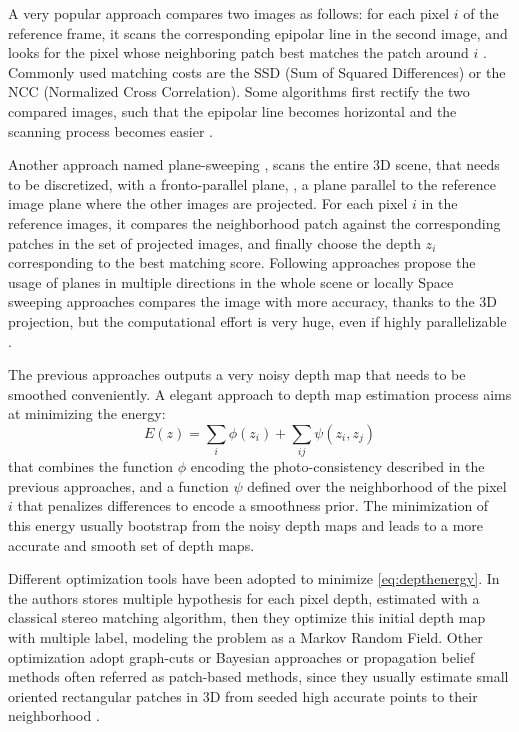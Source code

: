 A very popular approach compares two images as follows: for each pixel $i$ of the reference frame, it scans the corresponding epipolar line in the second image, and looks for the pixel whose neighboring patch best matches the patch around $i$  \cite{lhuillier2002match}. 
Commonly used matching costs are the SSD (Sum of Squared Differences) or the NCC (Normalized Cross Correlation).
Some algorithms first rectify the two compared images, such that the epipolar line becomes horizontal and the scanning process becomes easier 
\cite{kang2001handling,bradley2008accurate,moons20093d}. 

Another approach named plane-sweeping \cite{collins1996space}, scans the entire 3D scene, that needs to be discretized, with a fronto-parallel plane, \ie, a plane parallel to the reference image plane where the other images are projected. For each pixel $i$ in the reference images, it compares the neighborhood patch against the corresponding patches in the set of projected images, and finally choose the depth $z_i$ corresponding to the best matching score. 
Following approaches propose the usage of planes in multiple directions in the whole scene \cite{gallup2007real} or locally \cite{sinha2014efficient}
Space sweeping approaches compares the image with more accuracy, thanks to the 3D projection, but the computational effort is very huge, even if highly parallelizable \cite{yang2003multi}.

The previous approaches outputs a very noisy depth map that needs to be smoothed conveniently. 
A elegant approach to depth map estimation process aims at minimizing the energy:
\begin{equation}
 \label{eq:depthenergy} 
 E(z) = \sum_i \phi(z_i)  + \sum_{ij} \psi(z_i,z_j)
\end{equation}
that combines the function $\phi$ encoding the photo-consistency described in the previous approaches, and a function $\psi$ defined over the neighborhood of the pixel $i$ that penalizes differences to encode a smoothness prior. The minimization of this energy usually bootstrap from the noisy depth maps and leads to a more accurate and smooth set of depth maps.

Different optimization tools have been adopted to minimize \eqref{eq:depthenergy}. In \cite{campbell2008using} the authors stores multiple hypothesis for each pixel depth, estimated with a classical stereo matching algorithm, then they optimize this initial depth map with multiple label, modeling the problem as a Markov Random Field. Other optimization adopt graph-cuts \cite{kolmogorov2002multi} or Bayesian approaches \cite{strecha2006combined,gargallo2005bayesian} or propagation belief methods often referred as patch-based methods, since they usually estimate small oriented rectangular patches in 3D from seeded high accurate points to their neighborhood \cite{fu10,goesele2007multi,Tola12,bleyer2011patchmatch,heise2013pm}.




